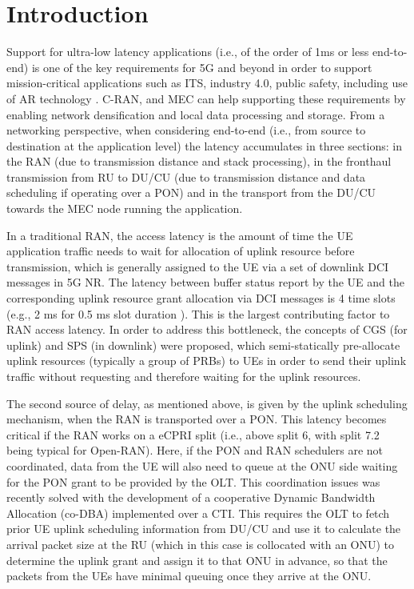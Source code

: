 \documentclass[a4paper, oneside, twocolumn, notitlepage, 10pt]{extarticle_ecoc}
\begin{document}
\section{Introduction}\label{sec:Intro}
	Support for ultra-low latency applications (i.e., of the order of 1ms or less end-to-end) is one of the key requirements for 5G and beyond in order to support mission-critical applications such as \ac{ITS}, industry 4.0, public safety, including use of \ac{AR} technology \cite{5G-NGMN-Verticals}. \ac{C-RAN}, and \ac{MEC} can help supporting these requirements by enabling network densification and local data processing and storage. From a networking perspective, when considering end-to-end (i.e., from source to destination at the application level) the latency accumulates in three sections: in the RAN (due to transmission distance and stack processing), in the fronthaul transmission from \ac{RU} to \ac{DU/CU} (due to transmission distance and data scheduling if operating over a PON) and in the transport from the DU/CU towards the MEC node running the application. 
	
	In a traditional RAN, the access latency is the amount of time the \ac{UE} application traffic needs to wait for allocation of uplink resource before transmission, which is generally assigned to the UE via a set of downlink \ac{DCI} messages in 5G \ac{NR}. The latency between buffer status report by the UE and the corresponding uplink resource grant allocation via DCI messages is 4 time slots (e.g., 2 ms for 0.5 ms slot duration \cite{5G-NR_Dahlman}). This is the largest contributing factor to RAN access latency. In order to address this bottleneck, the concepts of \ac{CGS} (for uplink) and \ac{SPS} (in downlink) were proposed, which semi-statically pre-allocate uplink resources (typically a group of \acp{PRB}) to UEs in order to send their uplink traffic without requesting and therefore waiting for the uplink resources. 
 	
 	The second source of delay, as mentioned above, is given by the uplink scheduling mechanism, when the RAN is transported over a PON. This latency becomes critical if the RAN works on a eCPRI split (i.e., above split 6, with split 7.2 being typical for Open-RAN). Here, if the PON and RAN schedulers are not coordinated, data from the UE will also need to queue at the ONU side waiting for the PON grant to be provided by the OLT. This coordination issues was recently solved with the development of a cooperative Dynamic Bandwidth Allocation (co-DBA) implemented over a \ac{CTI}\cite{O-RAN-CTI}. This requires the OLT to fetch prior UE uplink scheduling information from DU/CU and use it to calculate the arrival packet size at the RU (which in this case is collocated with an ONU) to determine the uplink grant and assign it to that ONU in advance, so that the packets from the UEs have minimal queuing once they arrive at the ONU. 
 	
\end{document}
